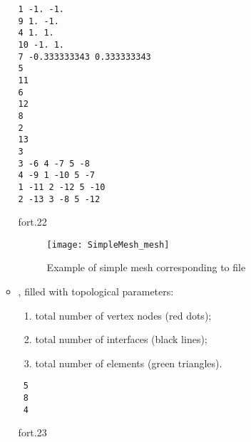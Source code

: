 \begin{itemize}
\begin{itemize}
\begin{exfile}[htpb]
\begin{footnotesize}
\texttt{1 -1. -1.\\
 9  1. -1.\\
 4  1.  1.\\
 10 -1.  1.\\
 7 -0.333333343  0.333333343\\
 5\\
 11\\
 6\\
 12\\
 8\\
 2\\
 13\\
 3\\
 3 -6 4 -7 5 -8\\
 4 -9 1 -10 5 -7\\
 1 -11 2 -12 5 -10\\
 2 -13 3 -8 5 -12\\
} 
\end{footnotesize}
\caption{fort.22\label{fig:fort22}}
\end{exfile}


\begin{figure}[H]
\centering
\texttt{[image: SimpleMesh\_mesh]}
\caption[Example of simple mesh]{Example of simple mesh corresponding to file }
\end{figure}




\item {}, filled with topological parameters: 
\begin{enumerate}
\item total number of vertex nodes (red dots);
\item total number of interfaces (black lines);  
\item total number of elements (green triangles).
\end{enumerate}

\begin{exfile}[H]
\begin{verbatim}
 5
 8
 4
 \end{verbatim}
\caption{fort.23\label{fig:fort23}}
\end{exfile}
 
\end{itemize}

\end{itemize}
